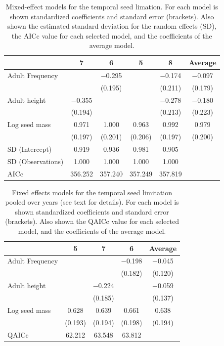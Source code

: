 \documentclass[A4]{article}
\begin{document}
%
\begin{table}
\caption{Mixed-effect models for the temporal seed limation. For each
  model is shown standardized coefficients and standard error
  (brackets). Also shown the estimated standard deviation for the
  random effects (SD), the AICc value for each selected model, and the
  coefficients of the average model.}
\centering
\begin{tabular}[t]{lccccc}
\toprule
  & 7 & 6 & 5 & 8 & Average\\
\midrule
Adult Frequency &  & \num{-0.295} &  & \num{-0.174} & \num{-0.097}\\
 &  & (\num{0.195}) &  & (\num{0.211}) & (\num{0.179})\\
Adult height & \num{-0.355} &  &  & \num{-0.278} & \num{-0.180}\\
 & (\num{0.194}) &  &  & (\num{0.213}) & (\num{0.223})\\
Log seed mass & \num{0.971} & \num{1.000} & \num{0.963} & \num{0.992} & \num{0.979}\\
 & (\num{0.197}) & (\num{0.201}) & (\num{0.206}) & (\num{0.197}) & (\num{0.200})\\
SD (Intercept) & \num{0.919} & \num{0.936} & \num{0.981} & \num{0.905} & \\
SD (Observations) & \num{1.000} & \num{1.000} & \num{1.000} & \num{1.000} & \\
\midrule
AICc & \num{356.252} & \num{357.240} & \num{357.249} & \num{357.819} & \\
\bottomrule
\end{tabular}
\label{tab:SSL_glm}
\end{table}


%
\begin{table}
\caption{Fixed effects models for the temporal seed limitation pooled
  over years (see text for details). For each model is shown
  standardized coefficients and standard error (brackets). Also shown
  the QAICc value for each selected model, and the coefficients of the
  average model.}
\centering
\begin{tabular}[t]{lcccc}
\toprule
  & 5 & 7 & 6 & Average\\
\midrule
Adult Frequency &  &  & \num{-0.198} & \num{-0.045}\\
 &  &  & (\num{0.182}) & (\num{0.120})\\
Adult height &  & \num{-0.224} &  & \num{-0.059}\\
 &  & (\num{0.185}) &  & (\num{0.137})\\
Log seed mass & \num{0.628} & \num{0.639} & \num{0.661} & \num{0.638}\\
 & (\num{0.193}) & (\num{0.194}) & (\num{0.198}) & (\num{0.194})\\
\midrule
QAICc & \num{62.212} & \num{63.548} & \num{63.812} & \\
\bottomrule
\end{tabular}
\label{tab:TSL_glm}
\end{table}
\end{document}
